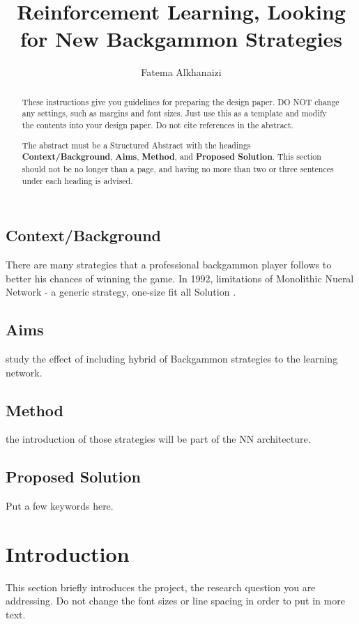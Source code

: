 \documentclass[12pt,a4paper]{article}
\title{Reinforcement Learning, Looking for New Backgammon Strategies}
\author{Fatema Alkhanaizi}
\date{}
\begin{document}
\maketitle

\begin{abstract}
These instructions give you guidelines for preparing the design paper.  DO NOT change any settings, such as margins and font sizes.  Just use this as a template and modify the contents into your design paper.  Do not cite references in the abstract.

The abstract must be a Structured Abstract with the headings {\bf Context/Background}, {\bf Aims}, {\bf Method}, and {\bf Proposed Solution}.  This section should not be no longer than a page, and having no more than two or three sentences under each heading is advised.
\end{abstract}

\subsection{Context/Background}
There are many strategies that a professional backgammon player follows to better his chances of winning the game. In 1992, limitations of Monolithic Nueral Network - a generic strategy, one-size fit all Solution .
\subsection{Aims}
study the effect of including hybrid of Backgammon strategies to the learning network.
\subsection{Method}
the introduction of those strategies will be part of the NN architecture. 
\subsection{Proposed Solution}


\begin{keywords}
Put a few keywords here.
\end{keywords}

\section{Introduction}
This section briefly introduces the project, the research question you are addressing.  Do not change the font sizes or line spacing in order to put in more text.
\end{document}
